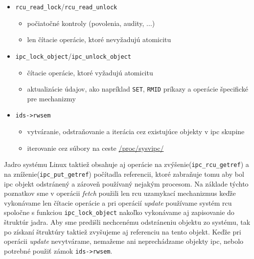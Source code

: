 \begin{itemize}
\item \texttt{rcu\_read\_lock}/\texttt{rcu\_read\_unlock}
\begin{itemize}
\item počiatočné kontroly (povolenia, audity, ...)
\item len čítacie operácie, ktoré nevyžadujú atomicitu 
\end{itemize}
\item \texttt{ipc\_lock\_object}/\texttt{ipc\_unlock\_object}
\begin{itemize}
\item čítacie operácie, ktoré vyžadujú atomicitu 
\item aktualizácie údajov, ako napríklad \texttt{SET}, \texttt{RMID} príkazy a operácie špecifické pre mechanizmy
\end{itemize}
\item \texttt{ids->rwsem}
\begin{itemize}
\item vytváranie, odstraňovanie a iterácia cez existujúce objekty v \acrshort{ipc} skupine
\item iterovanie cez súbory na ceste \url{/proc/sysvipc/}
\end{itemize}
\end{itemize}
Jadro systému Linux taktiež obsahuje aj operácie na zvýšenie(\texttt{ipc\_rcu\_getref}) a na zníženie(\texttt{ipc\_put\_getref}) počítadla referencii, ktoré zabraňuje tomu aby bol \acrshort{ipc} objekt odstránený a zároveň používaný nejakým procesom. Na základe týchto poznatkov sme v operácii \textit{fetch} použili len \acrshort{rcu} uzamykací mechanizmus keďže vykonávame len čítacie operácie a pri operácií \textit{update} používame systém \acrshort{rcu} spoločne s funkciou \texttt{ipc\_lock\_object} nakoľko vykonávame aj zapisovanie do štruktúr jadra. Aby sme predišli nechcenému odstráneniu objektu zo systému, tak po získaní štruktúry taktiež zvyšujeme aj referenciu na tento objekt. Keďže pri operácii \textit{update} nevytvárame, nemažeme ani neprechádzame objekty \acrshort{ipc}, nebolo potrebné použiť zámok \texttt{ids->rwsem}.

